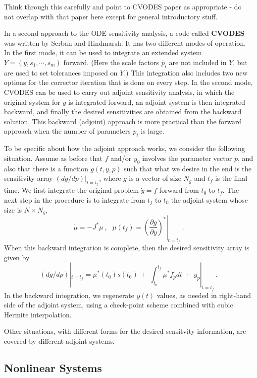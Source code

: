 {\sf Think through this carefully and point to CVODES paper as
appropriate - do not overlap with that paper here except for
general introductory stuff.}

In a second approach to the ODE sensitivity analysis, a code called
{\bf CVODES} was written by Serban and Hindmarsh.  It has two
different modes of operation.  In the first mode, it can be used to
integrate an extended system $Y = (y,s_1,\cdots,s_m)$ forward.  (Here
the scale factors $\bar{p}_i$ are not included in $Y$, but are used to
set tolerances imposed on $Y$.)  This integration also includes two
new options for the corrector iteration that is done on every step.
In the second mode, CVODES can be used to carry out adjoint
sensitivity analysis, in which the original system for $y$ is
integrated forward, an adjoint system is then integrated backward, and
finally the desired sensitivities are obtained from the backward
solution.  This backward (adjoint) approach is more practical than
the forward approach when the number of parameters $p_i$ is large.

To be specific about how the adjoint approach works, we consider
the following situation.  Assume as before that $f$ and/or $y_0$
involves the parameter vector $p$, and also that there is a
function $g(t,y,p)$ such that what we desire in the end is the
sensitivity array $(dg/dp)|_{t=t_f}$, where $g$ is a vector of
size $N_g$ and $t_f$ is the final time.  We first integrate the
original problem $\dot{y} = f$ forward from $t_0$ to $t_f$. The
next step in the procedure is to integrate from $t_f$ to $t_0$ the
adjoint system whose size is $N \times N_g$,
\[ \dot{\mu} = -J^* \mu ~,~~~
   \mu(t_f) = \left. \left( \frac{\partial g}{\partial y}
                     \right)^* \right| _{t=t_f} ~. \]
When this backward integration is complete, then the desired
sensitivity array is given by
\[ (dg/dp)|_{t=t_f} = \mu^*(t_0)s(t_0)
   ~+~ \int_{t_0}^{t_f} \mu^* f_p dt ~+~ g_p|_{t=t_f} ~. \]
In the backward integration, we regenerate $y(t)$ values, as needed
in right-hand side of the adjoint system, using a check-point scheme
combined with cubic Hermite interpolation.

Other situations, with different forms for the desired sensitvity
information, are covered by different adjoint systems.


\subsection{Nonlinear Systems}

